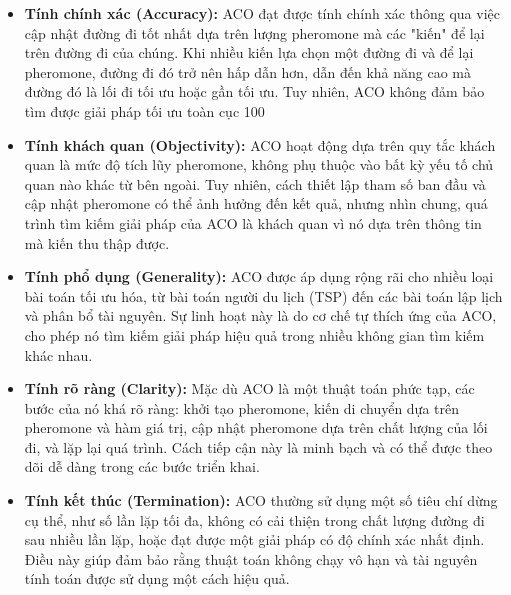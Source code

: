 \documentclass[14pt]{article}
\begin{document}
	\begin{itemize}
		\item \textbf{Tính chính xác (Accuracy):} ACO đạt được tính chính xác thông qua việc cập nhật đường đi tốt nhất dựa trên lượng pheromone mà các "kiến" để lại trên đường đi của chúng. Khi nhiều kiến lựa chọn một đường đi và để lại pheromone, đường đi đó trở nên hấp dẫn hơn, dẫn đến khả năng cao mà đường đó là lối đi tối ưu hoặc gần tối ưu. Tuy nhiên, ACO không đảm bảo tìm được giải pháp tối ưu toàn cục 100%
		\item \textbf{Tính khách quan (Objectivity):} ACO hoạt động dựa trên quy tắc khách quan là mức độ tích lũy pheromone, không phụ thuộc vào bất kỳ yếu tố chủ quan nào khác từ bên ngoài. Tuy nhiên, cách thiết lập tham số ban đầu và cập nhật pheromone có thể ảnh hưởng đến kết quả, nhưng nhìn chung, quá trình tìm kiếm giải pháp của ACO là khách quan vì nó dựa trên thông tin mà kiến thu thập được.
		\item \textbf{Tính phổ dụng (Generality):} ACO được áp dụng rộng rãi cho nhiều loại bài toán tối ưu hóa, từ bài toán người du lịch (TSP) đến các bài toán lập lịch và phân bổ tài nguyên. Sự linh hoạt này là do cơ chế tự thích ứng của ACO, cho phép nó tìm kiếm giải pháp hiệu quả trong nhiều không gian tìm kiếm khác nhau.
		\item \textbf{Tính rõ ràng (Clarity):} Mặc dù ACO là một thuật toán phức tạp, các bước của nó khá rõ ràng: khởi tạo pheromone, kiến di chuyển dựa trên pheromone và hàm giá trị, cập nhật pheromone dựa trên chất lượng của lối đi, và lặp lại quá trình. Cách tiếp cận này là minh bạch và có thể được theo dõi dễ dàng trong các bước triển khai.
		\item \textbf{Tính kết thúc (Termination):} ACO thường sử dụng một số tiêu chí dừng cụ thể, như số lần lặp tối đa, không có cải thiện trong chất lượng đường đi sau nhiều lần lặp, hoặc đạt được một giải pháp có độ chính xác nhất định. Điều này giúp đảm bảo rằng thuật toán không chạy vô hạn và tài nguyên tính toán được sử dụng một cách hiệu quả.
	\end{itemize}
	
\end{document}
